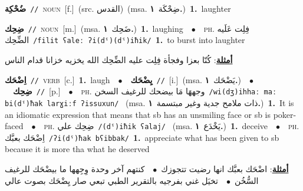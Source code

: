 \documentclass[10pt,a4paper,twoside]{article} %
\begin{document}
\begin{multicols}{2}
{{{{{\setlength\topsep{0pt}\textbf{\foreignlanguage{arabic}{ضُحْكِة}}\ {\color{gray}\texttt{//}\color{black}}\ \textsc{noun}\ [f.]\ (src. \color{gray}\foreignlanguage{arabic}{القدس}\color{black})\ \color{gray}(msa. \foreignlanguage{arabic}{ضِحْكَة}~\foreignlanguage{arabic}{\textbf{١.}})\color{black}\ \textbf{1.}~laughter\ 

{\setlength\topsep{0pt}\textbf{\foreignlanguage{arabic}{ضِحِك}}\ {\color{gray}\texttt{//}\color{black}}\ \textsc{noun}\ [m.]\ \color{gray}(msa. \foreignlanguage{arabic}{ضَحِك}~\foreignlanguage{arabic}{\textbf{١.}})\color{black}\ \textbf{1.}~laughing\ \ $\bullet$\ \ \textsc{ph.} \color{gray} \foreignlanguage{arabic}{فِلِت عَلَيه الضِّحِك}\color{black}\ {\color{gray}\texttt{/{\sffamily filit ʕaleː ʔi(dˤ)(dˤ)iħik}/}\color{black}}\ \textbf{1.}~to burst into laughter\  \begin{flushright}\color{gray}\foreignlanguage{arabic}{\textbf{\underline{\foreignlanguage{arabic}{أمثلة}}}: كُنّا بعزا وفجأة فِلِت عليه الضِّحِك الله يخزيه خزانا قدام الناس}\end{flushright}\color{black}} \vspace{2mm}

{\setlength\topsep{0pt}\textbf{\foreignlanguage{arabic}{اِضْحَك}}\ {\color{gray}\texttt{//}\color{black}}\ \textsc{verb}\ [c.]\ \textbf{1.}~laugh\ \ $\bullet$\ \ \setlength\topsep{0pt}\textbf{\foreignlanguage{arabic}{يِضْحَك}}\ {\color{gray}\texttt{//}\color{black}}\ [i.]\ \color{gray}(msa. \foreignlanguage{arabic}{يَضْحَك}~\foreignlanguage{arabic}{\textbf{١.}})\color{black}\ \ $\bullet$\ \ \setlength\topsep{0pt}\textbf{\foreignlanguage{arabic}{ضِحِك}}\ {\color{gray}\texttt{//}\color{black}}\ [p.]\ \ $\bullet$\ \ \textsc{ph.} \color{gray} \foreignlanguage{arabic}{وجههَا مَا بيضحك للرغيف السخن}\color{black}\ {\color{gray}\texttt{/{\sffamily wi(dʒ)ihhaː maː bi(dˤ)ħak larɣiːf ʔissuxun}/}\color{black}}\ \color{gray} (msa. \foreignlanguage{arabic}{ذات ملامح جدية وغير مبتسمة}~\foreignlanguage{arabic}{\textbf{١.}})\color{black}\ \textbf{1.}~It is an idiomatic expression that means that sb has an unsmiling face or sb is poker-faced\ \ $\bullet$\ \ \textsc{ph.} \color{gray} \foreignlanguage{arabic}{ضِحِك علي}\color{black}\ {\color{gray}\texttt{/{\sffamily (dˤ)iħik ʕalaj}/}\color{black}}\ \color{gray} (msa. \foreignlanguage{arabic}{يَخْدَع}~\foreignlanguage{arabic}{\textbf{١.}})\color{black}\ \textbf{1.}~deceive\ \ $\bullet$\ \ \textsc{ph.} \color{gray} \foreignlanguage{arabic}{اِضْحَك بعبَّك}\color{black}\ {\color{gray}\texttt{/{\sffamily ʔi(dˤ)ħak bʕibbak}/}\color{black}}\ \textbf{1.}~appreciate what has been given to sb because it is more tha what he deserved\  \begin{flushright}\color{gray}\foreignlanguage{arabic}{\textbf{\underline{\foreignlanguage{arabic}{أمثلة}}}: اضْحَك بعبَّك انها رضيت تتجوزك\ $\bullet$\ \  كنتهم آخر وحدة وِجِهها ما بيضْحَك للرغيف السُّخُن\ $\bullet$\ \  تخيَل غني بفرجيه بالتقرير الطبي تبعي صار يِضْحَك بصوت عالي}\end{flushright}\color{black}} \vspace{2mm}

}}}}}
\end{multicols}
\end{document}
